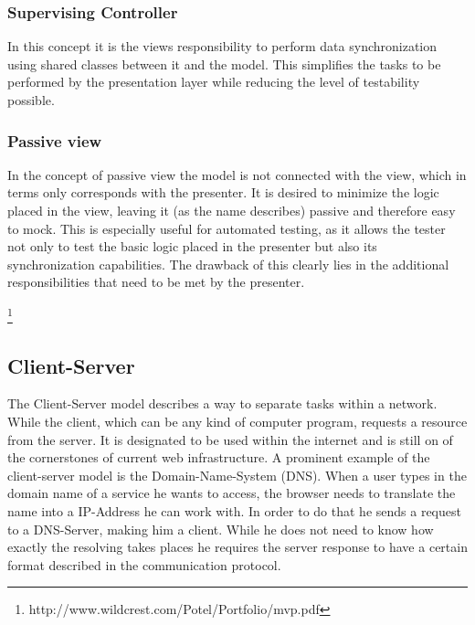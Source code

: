 \subsubsection{Supervising Controller}
In this concept it is the views responsibility to perform data synchronization using shared classes between it and the model. This simplifies the tasks to be performed by the presentation layer while reducing the level of testability possible. 
\subsubsection{Passive view}
In the concept of passive view the model is not connected with the view, which in terms only corresponds with the presenter. It is desired to minimize the logic placed in the view, leaving it (as the name describes) passive and therefore easy to mock. This is especially useful for automated testing, as it allows the tester not only to test the basic logic placed in the presenter but also its synchronization capabilities. The drawback of this clearly lies in the additional responsibilities that need to be met by the presenter.

\footnote{http://www.wildcrest.com/Potel/Portfolio/mvp.pdf}


\subsection{Client-Server}
The Client-Server model describes a way to separate tasks within a network. While the client, which can be any kind of computer program, requests a resource from the server. It is designated to be used within the internet and is still on of the cornerstones of current web infrastructure. A prominent example of the client-server model is the Domain-Name-System (DNS). When a user types in the domain name of a service he wants to access, the browser needs to translate the name into a IP-Address he can work with. In order to do that he sends a request to a DNS-Server, making him a client. While he does not need to know how exactly the resolving takes places he requires the server response to have a certain format described in the communication protocol. 

